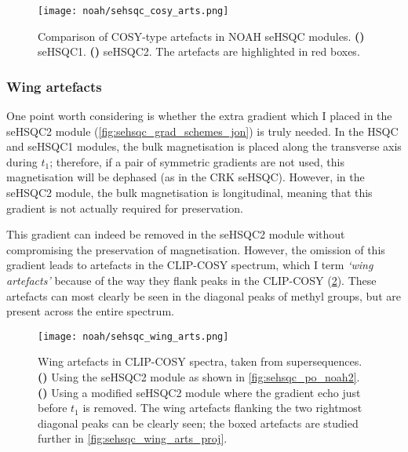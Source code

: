 \begin{figure}[!ht]
    \centering
    \texttt{[image: noah/sehsqc\_cosy\_arts.png]}%
    {\label{fig:sehsqc_cosy_arts_1}}%
    {\label{fig:sehsqc_cosy_arts_2}}%
    \caption[Comparison of COSY-type artefacts in NOAH seHSQC modules]{
        Comparison of COSY-type artefacts in NOAH seHSQC modules.
        \textbf{()} seHSQC1.
        \textbf{()} seHSQC2. The artefacts are highlighted in red boxes.
    }
    \label{fig:sehsqc_cosy_arts}
\end{figure}


\subsubsection{Wing artefacts}

One point worth considering is whether the extra gradient which I placed in the seHSQC2 module (\cref{fig:sehsqc_grad_schemes_jon}) is truly needed.
In the HSQC and seHSQC1 modules, the bulk magnetisation is placed along the transverse axis during $t_1$; therefore, if a pair of symmetric gradients are not used, this magnetisation will be dephased (as in the CRK seHSQC).
However, in the seHSQC2 module, the bulk magnetisation is longitudinal, meaning that this gradient is not actually required for  preservation.

This gradient can indeed be removed in the seHSQC2 module without compromising the preservation of  magnetisation.
However, the omission of this gradient leads to artefacts in the CLIP-COSY spectrum, which I term \textit{`wing artefacts'} because of the way they flank peaks in the CLIP-COSY (\cref{fig:sehsqc_wing_arts}).
These artefacts can most clearly be seen in the diagonal peaks of methyl groups, but are present across the entire spectrum.

\begin{figure}[!ht]
    \centering
    \texttt{[image: noah/sehsqc\_wing\_arts.png]}%
    {\label{fig:sehsqc_wing_arts_2grad}}%
    {\label{fig:sehsqc_wing_arts_1grad}}%
    \caption[Wing artefacts in CLIP-COSY spectra when extra seHSQC2 gradient is omitted]{
        Wing artefacts in CLIP-COSY spectra, taken from  supersequences.
        \textbf{()} Using the seHSQC2 module as shown in \cref{fig:sehsqc_po_noah2}.
        \textbf{()} Using a modified seHSQC2 module where the gradient echo just before $t_1$ is removed.
        The wing artefacts flanking the two rightmost diagonal peaks can be clearly seen; the boxed artefacts are studied further in \cref{fig:sehsqc_wing_arts_proj}.
    }
    \label{fig:sehsqc_wing_arts}
\end{figure}

